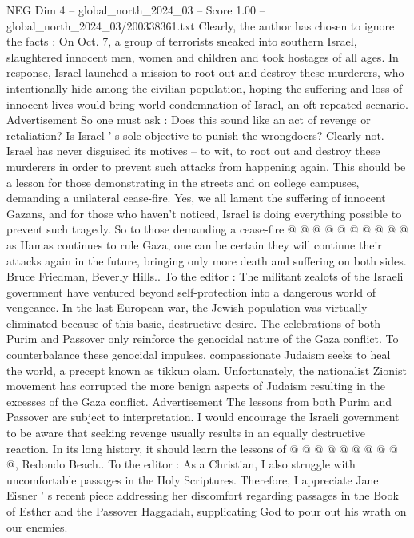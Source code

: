 \begin{textsample}{NEG Dim 4 – global\_north\_2024\_03 – Score 1.00 – global\_north\_2024\_03/200338361.txt}  \label{ex:f4_neg_217}
Clearly, the author has chosen to ignore the facts : On Oct. 7, a group of terrorists sneaked into southern Israel, slaughtered innocent men, women and children and took hostages of all ages.
In response, Israel launched a mission to root out and destroy these murderers, who intentionally hide among the civilian population, hoping the suffering and loss of innocent lives would bring world condemnation of Israel, an oft-repeated scenario.
Advertisement So one must ask : Does this sound like an act of revenge or retaliation?
Is Israel ' s sole objective to punish the wrongdoers?
Clearly not.
Israel has never disguised its motives -- to wit, to root out and destroy these murderers in order to prevent such attacks from happening again.
This should be a lesson for those demonstrating in the streets and on college campuses, demanding a unilateral cease-fire.
Yes, we all lament the suffering of innocent Gazans, and for those who haven't noticed, Israel is doing everything possible to prevent such tragedy.
So to those demanding a cease-fire @ @ @ @ @ @ @ @ @ @ as Hamas continues to rule Gaza, one can be certain they will continue their attacks again in the future, bringing only more death and suffering on both sides.
Bruce Friedman, Beverly Hills..
To the editor : The militant zealots of the Israeli government have ventured beyond self-protection into a dangerous world of vengeance.
In the last European war, the Jewish population was virtually eliminated because of this basic, destructive desire.
The celebrations of both Purim and Passover only reinforce the genocidal nature of the Gaza conflict.
To counterbalance these genocidal impulses, compassionate Judaism seeks to heal the world, a precept known as tikkun olam.
Unfortunately, the nationalist Zionist movement has corrupted the more benign aspects of Judaism resulting in the excesses of the Gaza conflict.
Advertisement The lessons from both Purim and Passover are subject to interpretation.
I would encourage the Israeli government to be aware that seeking revenge usually results in an equally destructive reaction.
In its long history, it should learn the lessons of @ @ @ @ @ @ @ @ @ @, Redondo Beach..
To the editor : As a Christian, I also struggle with uncomfortable passages in the Holy Scriptures.
Therefore, I appreciate Jane Eisner ' s recent piece addressing her discomfort regarding passages in the Book of Esther and the Passover Haggadah, supplicating God to pour out his wrath on our enemies.

\end{textsample}
